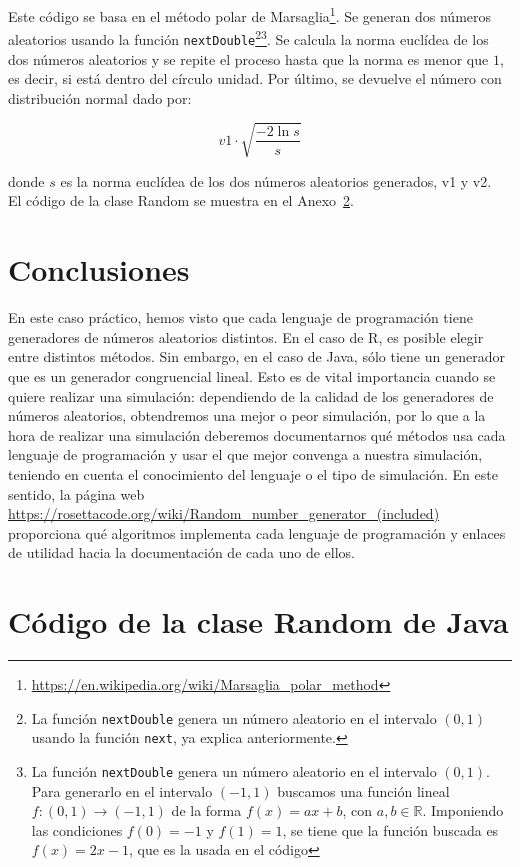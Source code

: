 \documentclass[12pt,a4paper,twoside,openright,titlepage,final]{article}
\begin{document}
Este código se basa en el método polar de Marsaglia\footnote{\url{https://en.wikipedia.org/wiki/Marsaglia_polar_method}}. Se generan dos números aleatorios usando la función \texttt{nextDouble}\footnote{La función \texttt{nextDouble} genera un número aleatorio en el intervalo $(0,1)$ usando la función \texttt{next}, ya explica anteriormente.}\footnote{La función \texttt{nextDouble} genera un número aleatorio en el intervalo $(0,1)$. Para generarlo en el intervalo $(-1,1)$ buscamos una función lineal $f: (0,1) \to (-1,1)$ de la forma $f(x) = ax + b$, con $a,b \in \mathbb{R}$. Imponiendo las condiciones $f(0)= -1$ y $f(1) = 1$, se tiene que la función buscada es $f(x) = 2x-1$, que es la usada en el código}. Se calcula la norma euclídea de los dos números aleatorios y se repite el proceso hasta que la norma es menor que $1$, es decir, si está dentro del círculo unidad. Por último, se devuelve el número con distribución normal dado por:

\[ v1 \cdot \sqrt{\dfrac{-2 \ln s}{s}} \]

donde $s$ es la norma euclídea de los dos números aleatorios generados, v1 y v2.\\

El código de la clase Random se muestra en el Anexo~\ref{app:Random}.

\section{Conclusiones}

En este caso práctico, hemos visto que cada lenguaje de programación tiene generadores de números aleatorios distintos. En el caso de R, es posible elegir entre distintos métodos. Sin embargo, en el caso de Java, sólo tiene un generador que es un generador congruencial lineal. Esto es de vital importancia cuando se quiere realizar una simulación: dependiendo de la calidad de los generadores de números aleatorios, obtendremos una mejor o peor simulación, por lo que a la hora de realizar una simulación deberemos documentarnos qué métodos usa cada lenguaje de programación y usar el que mejor convenga a nuestra simulación, teniendo en cuenta el conocimiento del lenguaje o el tipo de simulación. En este sentido, la página web \url{https://rosettacode.org/wiki/Random_number_generator_(included)} proporciona qué algoritmos implementa cada lenguaje de programación y enlaces de utilidad hacia la documentación de cada uno de ellos.  

\newpage
\appendix
\section{Código de la clase Random de Java}\label{app:Random}
\end{document}
